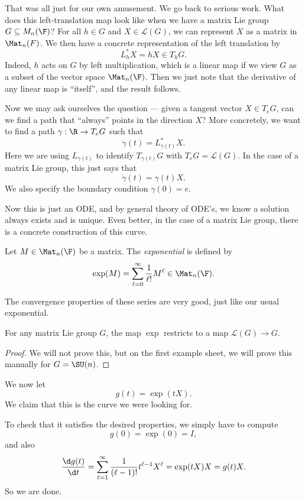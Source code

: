 \documentclass[a4paper]{article}
\begin{document}
That was all just for our own amusement. We go back to serious work. What does this left-translation map look like when we have a matrix Lie group $G \subseteq M_n(\F)$? For all $h \in G$ and $X \in \mathcal{L} (G)$, we can represent $X$ as a matrix in $\Mat_n(F)$. We then have a concrete representation of the left translation by
\[
  L_h^*X = hX \in T_hG.
\]
Indeed, $h$ acts on $G$ by left multiplication, which is a linear map if we view $G$ as a subset of the vector space $\Mat_n(\F)$. Then we just note that the derivative of any linear map is ``itself'', and the result follows.

Now we may ask ourselves the question --- given a tangent vector $X \in T_eG$, can we find a path that ``always'' points in the direction $X$? More concretely, we want to find a path $\gamma: \R \to T_e G$ such that
\[
  \dot{\gamma}(t) = L_{\gamma(t)}^* X.
\]
Here we are using $L_{\gamma(t)}$ to identify $T_{\gamma(t)}G$ with $T_e G = \mathcal{L}(G)$. In the case of a matrix Lie group, this just says that
\[
  \dot{\gamma}(t) = \gamma(t) X.
\]
We also specify the boundary condition $\gamma(0) = e$.

Now this is just an ODE, and by general theory of ODE's, we know a solution always exists and is unique. Even better, in the case of a matrix Lie group, there is a concrete construction of this curve.
\begin{defi}[Exponential]
  Let $M \in \Mat_n(\F)$ be a matrix. The \emph{exponential} is defined by
  \[
    \exp(M) = \sum_{\ell = 0}^\infty \frac{1}{\ell!} M^\ell \in \Mat_n(\F).
  \]
\end{defi}
The convergence properties of these series are very good, just like our usual exponential.

\begin{thm}
  For any matrix Lie group $G$, the map $\exp$ restricts to a map $\mathcal{L}(G) \to G$.
\end{thm}

\begin{proof}
  We will not prove this, but on the first example sheet, we will prove this manually for $G = \SU(n)$.
\end{proof}

We now let
\[
  g(t) = \exp(tX).
\]
We claim that this is the curve we were looking for.

To check that it satisfies the desired properties, we simply have to compute
\[
  g(0) = \exp(0) = I,
\]
and also
\[
  \frac{\d g(t)}{\d t} = \sum_{\ell = 1}^\infty \frac{1}{(\ell - 1)!} t^{\ell - 1} X^\ell = \exp(tX) X = g(t) X.
\]
So we are done.
\end{document}
